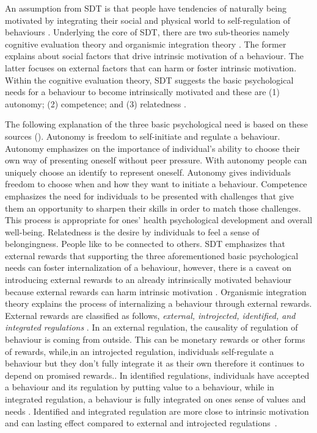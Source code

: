 \documentclass{sig-alternate}
\begin{document}
An assumption from SDT is that people have tendencies of naturally being motivated by integrating their social and physical world to self-regulation of behaviours \cite{lee2015:relating}. Underlying the core of SDT, there are two sub-theories namely cognitive evaluation theory and organismic integration theory \cite{ryan2000:self}. The former explains about social factors that drive intrinsic motivation of a behaviour. The latter focuses on external factors that can harm or foster intrinsic motivation.\newline  
Within the cognitive evaluation theory, SDT suggests the basic psychological needs for a behaviour to become intrinsically motivated and these are (1) autonomy; (2) competence; and (3) relatedness \cite{deci1985:intrinsic}.

The following explanation of the three basic psychological need is based on these sources (\cite{deci1985:intrinsic,ryan2000:self,lee2015:relating}). Autonomy is freedom to self-initiate and regulate a behaviour. Autonomy emphasizes on the importance of individual's ability to choose their own way of presenting oneself without peer pressure. With autonomy people can uniquely choose an identify to represent oneself. Autonomy gives individuals freedom to choose when and how they want to initiate a behaviour. Competence emphasizes the need for individuals to be presented with challenges that give them an opportunity to sharpen their skills in order to match those challenges. This process is appropriate for ones' health psychological development and  overall well-being\cite{zhang2008:motivational}. Relatedness is the desire by individuals to feel a sense of belongingness. People like to be connected to others. \newline  
SDT emphasizes that external rewards that supporting the three aforementioned basic psychological needs can foster internalization of a behaviour, however, there is a caveat on introducing external rewards to an already intrinsically motivated behaviour because external rewards can harm intrinsic motivation \cite{ryan2000:self}.\newline
Organismic integration theory explains the process of internalizing a behaviour through external rewards. External rewards are classified as follows, \emph{external, introjected, identified, and integrated regulations} \cite{ryan2000:self,lee2015:relating}. In an external regulation, the causality of  regulation of behaviour is coming from outside. This can be monetary rewards or other forms of rewards, while,in an introjected regulation, individuals self-regulate a behaviour but they don't fully integrate it as their own therefore it continues to depend on promised rewards.\cite {lee2015:relating}. In identified  regulations, individuals have accepted a behaviour and its regulation by putting value to a behaviour, while in integrated regulation,  a behaviour is fully integrated on ones sense of values and needs \cite{lee2015:relating}. Identified and integrated regulation are more close to intrinsic motivation and can lasting effect compared to external and introjected regulations~\cite{ryan2000intrinsic}.
 
\end{document}
